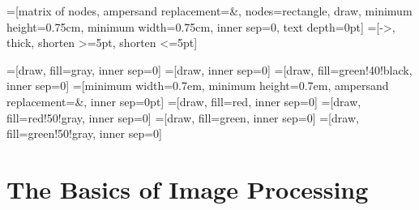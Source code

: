 

=[matrix of nodes, ampersand replacement=\&, nodes={rectangle, draw, minimum
	height=0.75cm,
minimum width=0.75cm, inner sep=0, text depth=0pt}]
=[->, thick, shorten >=5pt, shorten <=5pt]

=[draw, fill=gray, inner sep=0]
=[draw, inner sep=0]
=[draw, fill=green!40!black, inner sep=0]
=[minimum width=0.7em, minimum height=0.7em, ampersand
		replacement=\&, inner sep=0pt]
=[draw, fill=red, inner sep=0]
=[draw, fill=red!50!gray, inner sep=0]
=[draw, fill=green, inner sep=0]
=[draw, fill=green!50!gray, inner sep=0]


\subtitle{Image Processing}

\newcommand{\abs}[1]{\ensuremath{\big\vert #1\big\vert}}



\subtitle{Image Processing}
\frame[plain,c]{\titlepage}

\section{The Basics of Image Processing}%



